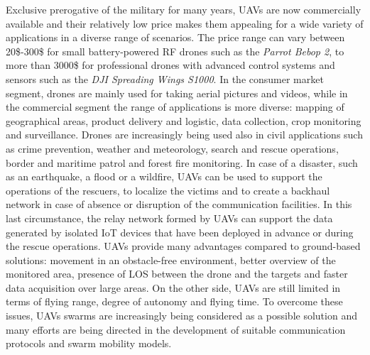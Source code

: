 Exclusive prerogative of the military for many years, \glspl{UAV} are now commercially available and their relatively low price makes them appealing for a wide variety of applications in a diverse range of scenarios. The price range can vary between 20\$-300\$ for small battery-powered \gls{RF} drones such as the \textit{Parrot Bebop 2}, to more than 3000\$ for professional drones with advanced control systems and sensors such as the \textit{DJI Spreading Wings S1000}. In the consumer market segment, drones are mainly used for taking aerial pictures and videos, while in the commercial segment the range of applications is more diverse: mapping of geographical areas, product delivery and logistic, data collection, crop monitoring and surveillance. Drones are increasingly being used also in civil applications such as crime prevention, weather and meteorology, search and rescue operations, border and maritime patrol and forest fire monitoring. In case of a disaster, such as an earthquake, a flood or a wildfire, \glspl{UAV} can be used to support the operations of the rescuers, to localize the victims and to create a backhaul network in case of absence or disruption of the communication facilities. In this last circumstance, the relay network formed by \glspl{UAV} can support the data generated by isolated \gls{IoT} devices that have been deployed in advance or during the rescue operations.  \glspl{UAV} provide many advantages compared to ground-based solutions: movement in an obstacle-free environment, better overview of the monitored area, presence of \gls{LOS} between the drone and the targets and faster data acquisition over large areas. On the other side, \glspl{UAV} are still limited in terms of flying range, degree of autonomy and flying time. To overcome these issues, \glspl{UAV} swarms are increasingly being considered as a possible solution and many efforts are being directed in the development of suitable communication protocols and swarm mobility models.  





